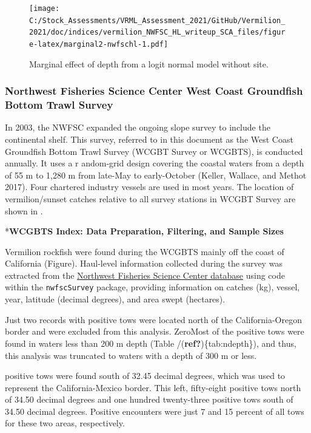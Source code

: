 \documentclass[
  english,
  a4paper,
]{article}
\begin{document}
\begin{figure}
\centering
\texttt{[image: C:/Stock\_Assessments/VRML\_Assessment\_2021/GitHub/Vermilion\_2021/doc/indices/vermilion\_NWFSC\_HL\_writeup\_SCA\_files/figure-latex/marginal2-nwfschl-1.pdf]}
\caption{\label{fig:marginal2-nwfschl}Marginal effect of depth from a logit normal model without site.}
\end{figure}

\clearpage

\hypertarget{northwest-fisheries-science-center-west-coast-groundfish-bottom-trawl-survey}{%
\subsubsection{Northwest Fisheries Science Center West Coast Groundfish Bottom Trawl Survey}\label{northwest-fisheries-science-center-west-coast-groundfish-bottom-trawl-survey}}

In 2003, the NWFSC expanded the ongoing slope survey to include the continental
shelf. This survey, referred to in this document as the West Coast Groundfish
Bottom Trawl Survey (WCGBT Survey or WCGBTS), is conducted annually. It uses a r
andom-grid design covering the coastal waters from a depth of 55 m to 1,280 m
from late-May to early-October (Keller, Wallace, and Methot 2017). Four chartered industry vessels
are used in most years. The location of vermilion/sunset catches relative to all
survey stations in WCGBT Survey are shown in .

*\textbf{WCGBTS Index: Data Preparation, Filtering, and Sample Sizes}

Vermilion rockfish were found during the WCGBTS mainly off the coast of
California (Figure). Haul-level information collected during the
survey was extracted from the
\href{https://www.webapps.nwfsc.noaa.gov/data}{Northwest Fisheries Science Center database}
using code within the \texttt{nwfscSurvey} package, providing information on
catches (kg),
vessel,
year,
latitude (decimal degrees), and
area swept (hectares).

Just
two
records with positive tows were located north of the California-Oregon border
and were excluded from this analysis.
ZeroMost of the positive tows were found in waters less than 200 m depth
(Table /(\textbf{ref?})\{tab:ndepth\}), and thus,
this analysis was truncated to waters with a depth of 300 m or less.

positive tows were found south of 32.45 decimal degrees,
which was used to represent the California-Mexico border.
This left,
fifty-eight
positive tows north of 34.50 decimal degrees and
one hundred twenty-three
positive tows south of 34.50 decimal degrees.
Positive encounters were just
7 and 15
percent of all tows for these two areas, respectively.
\end{document}
